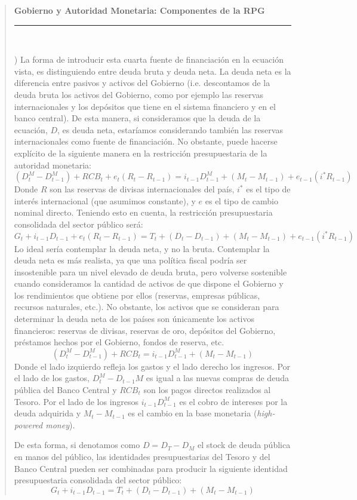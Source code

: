 \documentclass[10pt,a4paper]{article}
\newcounter{alphaitem}
\newenvironment{la}
      {\begin{list}{\alph{alphaitem})}{%
          \usecounter{alphaitem}%
          \setlength{\leftmargin}{1cm}%
          \setlength{\parskip}{3pt}%
          \setlength{\itemsep}{0pt}%
          \setlength{\parsep}{0pt}%
      }}
      {\end{list}}
\newenvironment{specialblock}[1]{%
      \begin{quote} %
      \small %
      \noindent\textbf{#1}\\[-0.3em] %
      \rule{\linewidth}{0.4pt}\\[0.6em]}{
      \end{quote}}
\begin{document}
\begin{specialblock}{Gobierno y Autoridad Monetaria: Componentes de la RPG}
\begin{la}
{        La forma de introducir esta cuarta fuente de financiación en la ecuación vista, es distinguiendo entre deuda bruta y deuda neta. La deuda neta es la diferencia entre pasivos y activos del Gobierno (i.e. descontamos de la deuda bruta los activos del Gobierno, como por ejemplo las reservas internacionales y los depósitos que tiene en el sistema financiero y en el banco central). De esta manera, si consideramos que la deuda de la ecuación, $D$, es deuda neta, estaríamos considerando también las reservas internacionales como fuente de financiación. No obstante, puede hacerse explícito de la siguiente manera en la restricción presupuestaria de la autoridad monetaria:
        $$(D_t^M-D_{t-1}^M)+RCB_t+e_t(R_t-R_{t-1})=i_{t-1}D_{t-1}^M+(M_t-M_{t-1})+e_{t-1}(i^*R_{t-1})$$ 
        Donde $R$ son las reservas de divisas internacionales del país, $i^*$ es el tipo de interés internacional (que asumimos constante), y $e$ es el tipo de cambio nominal directo. Teniendo esto en cuenta, la restricción presupuestaria consolidada del sector público será: $$G_t+i_{t-1}D_{t-1}+e_t(R_t-R_{t-1})=T_t+(D_t-D_{t-1})+(M_t-M_{t-1})+e_{t-1}(i^*R_{t-1})$$ 
        Lo ideal sería contemplar la deuda neta, y no la bruta. Contemplar la deuda neta es más realista, ya que una política fiscal podría ser insostenible para un nivel elevado de deuda bruta, pero volverse sostenible cuando consideramos la cantidad de activos de que dispone el Gobierno y los rendimientos que obtiene por ellos (reservas, empresas públicas, recursos naturales, etc.). No obstante, los activos que se consideran para determinar la deuda neta de los países son únicamente los activos financieros: reservas de divisas, reservas de oro, depósitos del Gobierno, préstamos hechos por el Gobierno, fondos de reserva, etc.
        } 
        $$(D_t^M-D_{t-1}^M)+RCB_t=i_{t-1}D_{t-1}^M+(M_t-M_{t-1})$$ 
        Donde el lado izquierdo refleja los gastos y el lado derecho los ingresos. Por el lado de los gastos, $D_t^M-D_{t-1}M$ es igual a las nuevas compras de deuda pública del Banco Central y $RCB_t$ son los pagos directos realizados al Tesoro. Por el lado de los ingresos $i_{t-1}D_{t-1}^M$ es el cobro de intereses por la deuda adquirida y $M_t-M_{t-1}$ es el cambio en la base monetaria (\textit{high-powered money}).
    \end{la}
    
    De esta forma, si denotamos como $D=D_T-D_M$ el stock de deuda pública en manos del público, las identidades presupuestarias del Tesoro y del Banco Central pueden ser combinadas para producir la siguiente identidad presupuestaria consolidada del sector público:
    $$G_t+i_{t-1}D_{t-1}=T_t+(D_t-D_{t-1})+(M_t-M_{t-1})$$
    

\end{specialblock}
\end{document}
